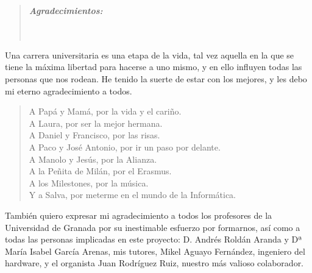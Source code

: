 \cleardoublepage
{}
{}

\vspace*{2.5cm}


\begin{quotation}
\noindent \begin{center}
\textbf{\emph{\Large Agradecimientos:}}\textbf{\emph{\large }}\\
\textbf{\emph{\large }}\\
\textbf{\emph{\large }}\\
\textbf{\emph{\large }}
\par\end{center}{\large \par}
\end{quotation}

\begin{onehalfspace}

Una carrera universitaria es una etapa de la vida, tal vez aquella en la que se tiene la máxima libertad para hacerse a uno mismo, y en ello influyen todas las personas que nos rodean. He tenido la suerte de estar con los mejores, y les debo mi eterno agradecimiento a todos.

\begin{quote}
	A Papá y Mamá, por la vida y el cariño. \\
	A Laura, por ser la mejor hermana. \\
	A Daniel y Francisco, por las risas. \\
	A Paco y José Antonio, por ir un paso por delante. \\
	A Manolo y Jesús, por la Alianza. \\
	A la Peñita de Milán, por el Erasmus. \\
	A los Milestones, por la música. \\
	Y a Salva, por meterme en el mundo de la Informática.
\end{quote}

También quiero expresar mi agradecimiento a todos los profesores de la Universidad de Granada por su inestimable esfuerzo por formarnos, así como a todas las personas implicadas en este proyecto: D. Andrés Roldán Aranda y Dª María Isabel García Arenas, mis tutores, Mikel Aguayo Fernández, ingeniero del hardware, y el organista Juan Rodríguez Ruiz, nuestro más valioso colaborador.

\end{onehalfspace}


\clearpage{\pagestyle{empty}\cleardoublepage}%
